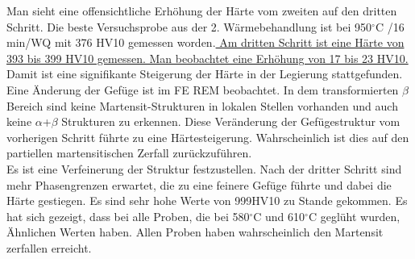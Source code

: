 Man sieht eine offensichtliche Erhöhung der Härte vom zweiten auf den dritten Schritt. Die beste Versuchsprobe aus der 2. Wärmebehandlung ist bei 950$^\circ$C /16 min/WQ mit 376 HV10 gemessen worden.\underline{ Am dritten Schritt ist eine Härte von 393 bis 399 HV10 gemessen. Man beobachtet eine Erhöhung von 17 bis 23 HV10.} Damit ist eine signifikante Steigerung der Härte in der Legierung stattgefunden. Eine Änderung der Gefüge ist im FE REM beobachtet. In dem transformierten $\beta$ Bereich sind keine Martensit-Strukturen in lokalen Stellen vorhanden und auch keine $\alpha$+$\beta$ Strukturen zu erkennen. Diese Veränderung der Gefügestruktur vom vorherigen Schritt führte zu eine Härtesteigerung. Wahrscheinlich ist dies auf den partiellen martensitischen Zerfall zurückzuführen.
\\Es ist eine Verfeinerung der Struktur festzustellen. Nach der dritter Schritt sind mehr Phasengrenzen erwartet, die zu eine feinere Gefüge führte und dabei die Härte gestiegen. Es sind sehr hohe Werte von 999HV10 zu Stande gekommen. Es hat sich gezeigt, dass bei alle Proben, die bei 580$^\circ$C und 610$^\circ$C geglüht wurden, Ähnlichen Werten haben. Allen Proben haben wahrscheinlich den Martensit zerfallen erreicht.
